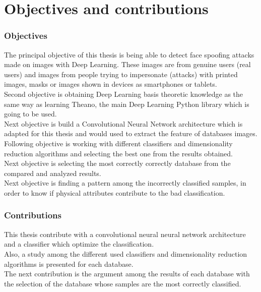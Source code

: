 \section{Objectives and contributions}
\subsubsection{Objectives}
The principal objective of this thesis is being able to detect face spoofing attacks made on images with Deep Learning. These images are from genuine users (real users) and images from people trying to impersonate (attacks) with printed images, masks or images shown in devices as smartphones or tablets.\\

Second objective is obtaining Deep Learning basis theoretic knowledge as the same way as learning Theano, the main Deep Learning Python library which is going to be used.\\

Next objective is build a Convolutional Neural Network architecture which is adapted for this thesis and would used to extract the feature of databases images.\\

Following objective is working with different classifiers and dimensionality reduction algorithms and selecting the best one from the results obtained.\\

Next objective is selecting the most correctly correctly database from the compared and analyzed results.\\

Next objective is finding a pattern among the incorrectly classified samples, in order to know if physical attributes contribute to the bad classification.\\


\subsubsection{Contributions}
This thesis contribute with a convolutional neural neural network architecture and a classifier which optimize the classification.\\

Also, a study among the different used classifiers and dimensionality reduction algorithms is presented for each database.\\

The next contribution is the argument among the results of each database with the selection of the database whose samples are the most correctly classified.\\

